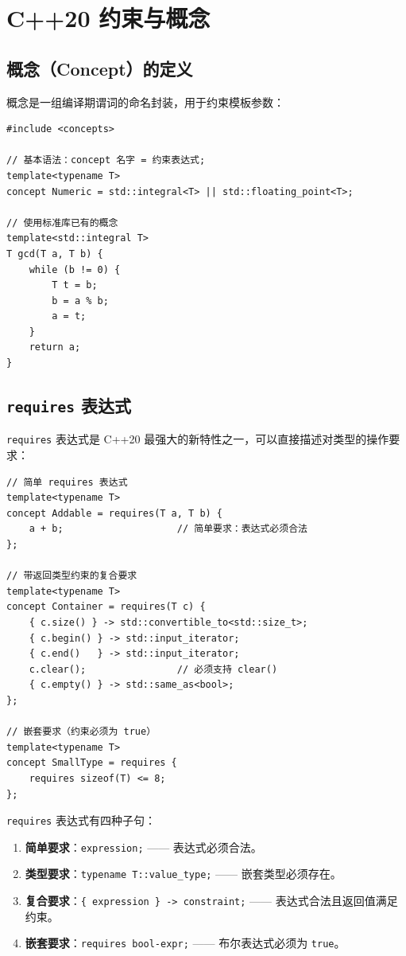 \documentclass[12pt,a4paper,fontset=fandol]{ctexbook}
\begin{document}
\section{C++20 约束与概念}

\subsection{概念（Concept）的定义}

概念是一组编译期谓词的命名封装，用于约束模板参数：

\begin{lstlisting}
#include <concepts>

// 基本语法：concept 名字 = 约束表达式;
template<typename T>
concept Numeric = std::integral<T> || std::floating_point<T>;

// 使用标准库已有的概念
template<std::integral T>
T gcd(T a, T b) {
    while (b != 0) {
        T t = b;
        b = a % b;
        a = t;
    }
    return a;
}
\end{lstlisting}

\subsection{\texttt{requires} 表达式}

\texttt{requires} 表达式是 C++20 最强大的新特性之一，可以直接描述对类型的操作要求：

\begin{lstlisting}
// 简单 requires 表达式
template<typename T>
concept Addable = requires(T a, T b) {
    a + b;                    // 简单要求：表达式必须合法
};

// 带返回类型约束的复合要求
template<typename T>
concept Container = requires(T c) {
    { c.size() } -> std::convertible_to<std::size_t>;
    { c.begin() } -> std::input_iterator;
    { c.end()   } -> std::input_iterator;
    c.clear();                // 必须支持 clear()
    { c.empty() } -> std::same_as<bool>;
};

// 嵌套要求（约束必须为 true）
template<typename T>
concept SmallType = requires {
    requires sizeof(T) <= 8;
};
\end{lstlisting}

\texttt{requires} 表达式有四种子句：

\begin{enumerate}[nosep]
  \item \textbf{简单要求}：\texttt{expression;} —— 表达式必须合法。
  \item \textbf{类型要求}：\texttt{typename T::value\_type;} —— 嵌套类型必须存在。
  \item \textbf{复合要求}：\texttt{\{ expression \} -> constraint;} —— 表达式合法且返回值满足约束。
  \item \textbf{嵌套要求}：\texttt{requires bool-expr;} —— 布尔表达式必须为 \texttt{true}。
\end{enumerate}
\end{document}
